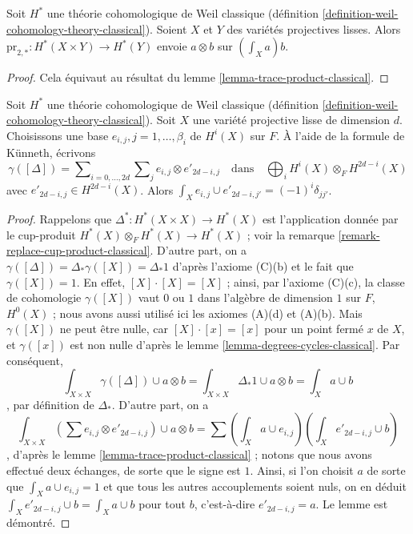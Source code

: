 \begin{lemma}
\label{lemma-pr2star-classical}
Soit $H^*$ une théorie cohomologique de Weil classique
(définition \ref{definition-weil-cohomology-theory-classical}).
Soient $X$ et $Y$ des variétés projectives lisses.
Alors $\text{pr}_{2, *} : H^*(X \times Y) \to H^*(Y)$
envoie $a \otimes b$ sur $(\int_X a) b$.
\end{lemma}

\begin{proof}
Cela équivaut au résultat du lemme \ref{lemma-trace-product-classical}.
\end{proof}

\begin{lemma}
\label{lemma-class-diagonal-classical}
Soit $H^*$ une théorie cohomologique de Weil classique
(définition \ref{definition-weil-cohomology-theory-classical}).
Soit $X$ une variété projective lisse de dimension $d$.
Choisissons une base $e_{i, j}, j = 1, \ldots, \beta_i$ de $H^i(X)$ sur $F$.
À l'aide de la formule de K\"unneth, écrivons
$$
\gamma([\Delta]) =
\sum\nolimits_{i = 0, \ldots, 2d}
\sum\nolimits_j e_{i, j} \otimes e'_{2d - i , j}
\quad\text{dans}\quad
\bigoplus\nolimits_i H^i(X) \otimes_F H^{2d - i}(X)
$$
avec $e'_{2d - i, j} \in H^{2d - i}(X)$.
Alors $\int_X e_{i, j} \cup e'_{2d - i, j'} = (-1)^i\delta_{jj'}$.
\end{lemma}

\begin{proof}
Rappelons que $\Delta^* : H^*(X \times X) \to H^*(X)$ est l'application
donnée par le cup-produit $H^*(X) \otimes_F H^*(X) \to H^*(X)$ ; voir
la remarque \ref{remark-replace-cup-product-classical}. D'autre part, on a
$\gamma([\Delta]) = \Delta_*\gamma([X]) = \Delta_*1$ d'après
l'axiome (C)(b) et le fait que $\gamma([X]) = 1$. En effet,
$[X] \cdot [X] = [X]$ ; ainsi, par l'axiome (C)(c), la classe de cohomologie
$\gamma([X])$ vaut $0$ ou $1$ dans l'algèbre de dimension $1$ sur $F$, $H^0(X)$ ;
nous avons aussi utilisé ici les axiomes (A)(d) et (A)(b).
Mais $\gamma([X])$ ne peut être nulle, car $[X] \cdot [x] = [x]$
pour un point fermé $x$ de $X$, et $\gamma([x])$
est non nulle d'après le lemme \ref{lemma-degrees-cycles-classical}.
Par conséquent,
$$
\int_{X \times X} \gamma([\Delta]) \cup a \otimes b =
\int_{X \times X} \Delta_*1 \cup a \otimes b =
\int_X a \cup b
$$,
par définition de $\Delta_*$. D'autre part, on a
$$
\int_{X \times X} (\sum e_{i, j} \otimes e'_{2d -i , j}) \cup a \otimes b =
\sum (\int_X a \cup e_{i, j})(\int_X e'_{2d - i, j} \cup b)
$$,
d'après le lemme \ref{lemma-trace-product-classical} ; notons que nous avons
effectué deux échanges, de sorte que le signe est $1$.
Ainsi, si l'on choisit $a$ de sorte que $\int_X a \cup e_{i, j} = 1$
et que tous les autres accouplements soient nuls, on en déduit
$\int_X e'_{2d - i, j} \cup b = \int_X a \cup b$ pour tout $b$, c'est-à-dire
$e'_{2d - i, j} = a$. Le lemme est démontré.
\end{proof}


